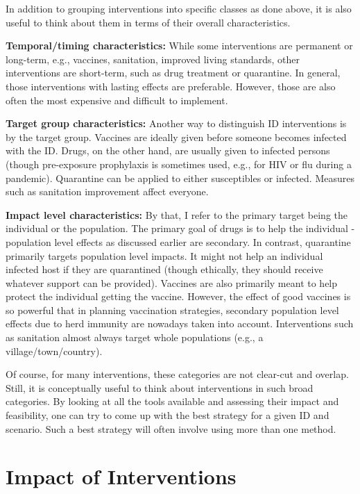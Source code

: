 \documentclass[
]{book}
\begin{document}
In addition to grouping interventions into specific classes as done above, it is also useful to think about them in terms of their overall characteristics.

\textbf{Temporal/timing characteristics:} While some interventions are permanent or long-term, e.g., vaccines, sanitation, improved living standards, other interventions are short-term, such as drug treatment or quarantine. In general, those interventions with lasting effects are preferable. However, those are also often the most expensive and difficult to implement.

\textbf{Target group characteristics:} Another way to distinguish ID interventions is by the target group. Vaccines are ideally given before someone becomes infected with the ID. Drugs, on the other hand, are usually given to infected persons (though pre-exposure prophylaxis is sometimes used, e.g., for HIV or flu during a pandemic). Quarantine can be applied to either susceptibles or infected. Measures such as sanitation improvement affect everyone.

\textbf{Impact level characteristics:} By that, I refer to the primary target being the individual or the population. The primary goal of drugs is to help the individual - population level effects as discussed earlier are secondary. In contrast, quarantine primarily targets population level impacts. It might not help an individual infected host if they are quarantined (though ethically, they should receive whatever support can be provided). Vaccines are also primarily meant to help protect the individual getting the vaccine. However, the effect of good vaccines is so powerful that in planning vaccination strategies, secondary population level effects due to herd immunity are nowadays taken into account. Interventions such as sanitation almost always target whole populations (e.g., a village/town/country).

Of course, for many interventions, these categories are not clear-cut and overlap. Still, it is conceptually useful to think about interventions in such broad categories. By looking at all the tools available and assessing their impact and feasibility, one can try to come up with the best strategy for a given ID and scenario. Such a best strategy will often involve using more than one method.

\hypertarget{impact-of-interventions}{%
\section{Impact of Interventions}\label{impact-of-interventions}}
\end{document}
